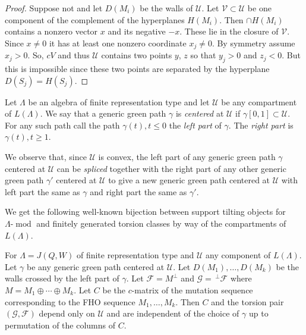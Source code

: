 \documentclass[ALCO,ThmDefs,Unicode,epreuves]{cedram}
\DeclareMathOperator{\modr}{mod}
\newcommand{\cF}{\ensuremath{{\mathcal{F}}}}
\newcommand{\cG}{\ensuremath{{\mathcal{G}}}}
\newcommand{\cU}{\ensuremath{{\mathcal{U}}}}
\newcommand{\cV}{\ensuremath{{\mathcal{V}}}}
\begin{document}
\begin{proof}
Suppose not and let $D(M_i)$ be the walls of $\cU$. Let $\cV\subset \cU$ be one component of the complement of the hyperplanes $H(M_i)$. Then $\cap H(M_i)$ contains a nonzero vector $x$ and its negative $-x$. These lie in the closure of $\cV$. Since $x\neq0$ it has at least one nonzero coordinate $x_j\neq0$. By symmetry assume $x_j>0$. So, $cV$ and thus $\cU$ contains two points $y$, $z$ so that $y_j>0$ and $z_j<0$. But this is impossible since these two points are separated by the hyperplane $D(S_j)=H(S_j)$.
\end{proof}

\begin{defi}
Let $\Lambda$ be an algebra of finite representation type and let $\cU$ be any compartment of $L(\Lambda)$. We say that a generic green path $\gamma$ is \emph{centered} at $\cU$ if $\gamma[0,1]\subset \cU$. For any such path call the path $\gamma(t),t\le0$ the \emph{left part} of $\gamma$. The \emph{right part} is $\gamma(t),t\ge1$. 
\end{defi}

We observe that, since $\cU$ is convex, the left part of any generic green path $\gamma$ centered at $\cU$ can be \emph{spliced} together with the right part of any other generic green path $\gamma'$ centered at $\cU$ to give a new generic green path centered at $\cU$ with left part the same as $\gamma$ and right part the same as $\gamma'$.

We get the following well-known bijection between support tilting objects for $\Lambda\text{-}\modr $ and finitely generated torsion classes by way of the compartments of $L(\Lambda)$.

\begin{lemm}
For $\Lambda=J(Q,W)$ of finite representation type and $\cU$ any component of $L(\Lambda)$. Let $\gamma$ be any generic green path centered at $\cU$. Let $D(M_1),\ldots,D(M_k)$ be the walls crossed by the left part of $\gamma$. Let $\cF=M^\perp$ and $\cG=\,^\perp \cF$ where $M=M_1\oplus\cdots\oplus M_k$. Let $C$ be the $c$-matrix of the mutation sequence corresponding to the FHO sequence $M_1,\ldots,M_k$. Then $C$ and the torsion pair $(\cG,\cF)$ depend only on $\cU$ and are independent of the choice of $\gamma$ up to permutation of the columns of $C$. 
\end{lemm}
\end{document}
